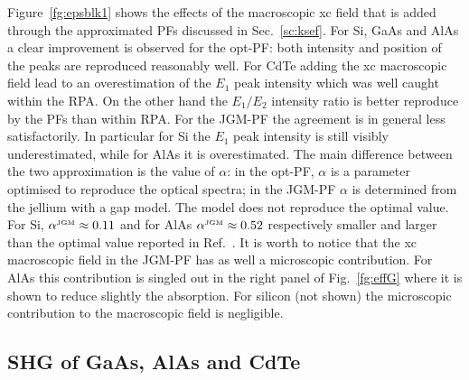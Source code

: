 Figure~\ref{fg:epsblk1} shows the effects of the macroscopic xc field that is added through the approximated PFs discussed in Sec.~\ref{sc:ksef}. For Si, GaAs and AlAs a clear improvement is observed for the opt-PF: both intensity and position of the peaks are reproduced reasonably well. For CdTe adding the xc macroscopic field lead to an overestimation of the $E_1$ peak intensity which was well caught within the RPA. On the other hand the $E_1/E_2$ intensity ratio is better reproduce by the PFs than within RPA.
For the JGM-PF the agreement is in general less satisfactorily. In particular for Si the $E_1$ peak intensity is still visibly underestimated, while for AlAs it is overestimated. The main difference between the two approximation is the value of $\alpha$: in the opt-PF, $\alpha$ is a parameter optimised to reproduce the optical spectra; in the JGM-PF $\alpha$ is determined from the jellium with a gap model. The model does not reproduce the optimal value. For Si, $\alpha^{\scriptscriptstyle\rm JGM} \approx 0.11$ and for AlAs $\alpha^{\scriptscriptstyle\rm JGM} \approx 0.52$ respectively smaller and larger than the optimal value reported in Ref.~\cite{gruningtddf1}. It is worth to notice that the xc macroscopic field in the JGM-PF has as well a microscopic contribution. For AlAs this contribution is singled out in the right panel of Fig.~\ref{fg:effG} where it is shown to reduce slightly the absorption. For silicon (not shown) the microscopic contribution to the macroscopic field is negligible.

\subsection{SHG of GaAs, AlAs and CdTe} 



